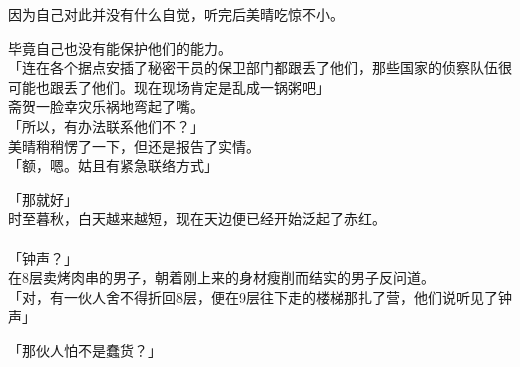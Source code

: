 因为自己对此并没有什么自觉，听完后美晴吃惊不小。

毕竟自己也没有能保护他们的能力。\\

「连在各个据点安插了秘密干员的保卫部门都跟丢了他们，那些国家的侦察队伍很可能也跟丢了他们。现在现场肯定是乱成一锅粥吧」\\

斋贺一脸幸灾乐祸地弯起了嘴。\\

「所以，有办法联系他们不？」\\

美晴稍稍愣了一下，但还是报告了实情。\\

「额，嗯。姑且有紧急联络方式」

「那就好」\\

时至暮秋，白天越来越短，现在天边便已经开始泛起了赤红。\\

\sqsplit\\

「钟声？」\\

在8层卖烤肉串的男子，朝着刚上来的身材瘦削而结实的男子反问道。\\

「对，有一伙人舍不得折回8层，便在9层往下走的楼梯那扎了营，他们说听见了钟声」

「那伙人怕不是蠢货？」\\

